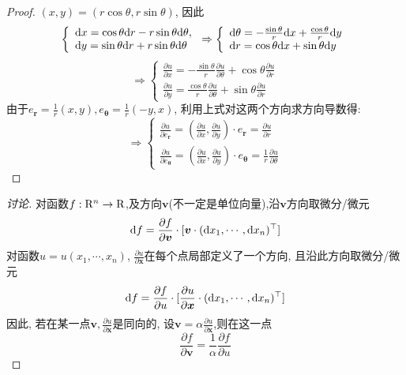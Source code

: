 \documentclass[a4paper,12pt]{article}
\begin{document}
\begin{proof}
  $(x,y)=(r\cos\theta,r\sin\theta)$, 因此
  \[
    \left\{
    \begin{array}{l}
    \mathrm{d} x=\cos\theta\mathrm{d} r-r\sin\theta\mathrm{d}\theta,\\
    \mathrm{d} y=\sin\theta\mathrm{d} r+r\sin\theta\mathrm{d}\theta
    \end{array}
    \right.\Rightarrow
    \left\{
      \begin{array}{l}
        \mathrm{d}\theta=-\frac{\sin\theta}{r}\mathrm{d} x+\frac{\cos\theta}{r}\mathrm{d} y\\
        \mathrm{d} r=\cos\theta\mathrm{d} x+\sin\theta\mathrm{d} y
      \end{array}
      \right.
  \]
\[\Rightarrow\left\{
  \begin{array}{l}
    \frac{\partial u}{\partial x}=-\frac{\sin\theta}{r}\frac{\partial u}{\partial \theta}+\cos\theta\frac{\partial u}{\partial r}\\
    \frac{\partial u}{\partial y}=\frac{\cos\theta}{r}\frac{\partial u}{\partial \theta}+\sin\theta\frac{\partial u}{\partial r}
  \end{array}\right.
    \]
    由于$e_{\bm{r}}=\frac{1}{r}(x,y),e_{\bm{\theta}}=\frac{1}{r}(-y,x)$, 利用上式对这两个方向求方向导数得:
  \[\Rightarrow\left\{
    \begin{array}{l}
      \frac{\partial u}{\partial e_{\bm{r}}}=(\frac{\partial u}{\partial x},\frac{\partial u}{\partial y})\cdot e_{\bm{r}}=\frac{\partial u}{\partial r}\\
      \frac{\partial u}{\partial e_{\bm{\theta}}}=(\frac{\partial u}{\partial x},\frac{\partial u}{\partial y})\cdot e_{\bm{\theta}}=\frac{1}{r}\frac{\partial u}{\partial \theta}
    \end{array}
    \right.
    \]
\end{proof}
\begin{proof}[讨论]
  对函数$f:\mathrm{R}^n\to\mathrm{R}$,及方向$\bm{v}$(不一定是单位向量),沿$\bm{v}$方向取微分/微元
  \[\mathrm{d} f=\frac{\partial f}{\partial\bm{v}}\cdot[\bm{v}\cdot(\mathrm{d} x_1,\cdots,\mathrm{d} x_n)^\top]\]
  对函数$u=u(x_1,\cdots,x_n)$, $\frac{\partial u}{\partial \bm{x}}$在每个点局部定义了一个方向, 且沿此方向取微分/微元
  \[\mathrm{d} f=\frac{\partial f}{\partial u}\cdot[\frac{\partial u}{\partial \bm{x}}\cdot(\mathrm{d} x_1,\cdots,\mathrm{d} x_n)^\top]\]
  因此, 若在某一点$\bm{v},\frac{\partial u}{\partial\bm{x}}$是同向的, 设$\bm{v}=\alpha\frac{\partial u}{\partial\bm{x}}$,则在这一点
  \[\frac{\partial f}{\partial\bm{v}}=\frac{1}{\alpha}\frac{\partial f}{\partial u}\]
\end{proof}
\end{document}
